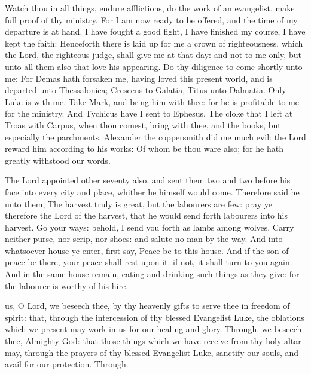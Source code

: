  Watch thou in all things, endure afflictions, do the work of an evangelist, make full proof of thy ministry. For I am now ready to be offered, and the time of my departure is at hand. I have fought a good fight, I have finished my course, I have kept the faith: Henceforth there is laid up for me a crown of righteousness, which the Lord, the righteous judge, shall give me at that day: and not to me only, but unto all them also that love his appearing. Do thy diligence to come shortly unto me: For Demas hath forsaken me, having loved this present world, and is departed unto Thessalonica; Crescens to Galatia, Titus unto Dalmatia. Only Luke is with me. Take Mark, and bring him with thee: for he is profitable to me for the ministry. And Tychicus have I sent to Ephesus. The cloke that I left at Troas with Carpus, when thou comest, bring with thee, and the books, but especially the parchments. Alexander the coppersmith did me much evil: the Lord reward him according to his works: Of whom be thou ware also; for he hath greatly withstood our words.


 The Lord appointed other seventy also, and sent them two and two before his face into every city and place, whither he himself would come. Therefore said he unto them, The harvest truly is great, but the labourers are few: pray ye therefore the Lord of the harvest, that he would send forth labourers into his harvest. Go your ways: behold, I send you forth as lambs among wolves. Carry neither purse, nor scrip, nor shoes: and salute no man by the way. And into whatsoever house ye enter, first say, Peace be to this house. And if the son of peace be there, your peace shall rest upon it: if not, it shall turn to you again. And in the same house remain, eating and drinking such things as they give: for the labourer is worthy of his hire.

\secret
{} us, O Lord, we beseech thee, by thy heavenly gifts to serve thee in freedom of spirit: that, through the intercession of thy blessed Evangelist Luke, the oblations which we present may work in us for our healing and glory. Through.
\postcommunion
{} we beseech thee, Almighty God: that those things which we have receive from thy holy altar may, through the prayers of thy blessed Evangelist Luke, sanctify our souls, and avail for our protection. Through.


